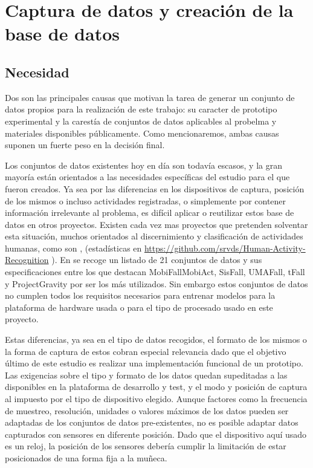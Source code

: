 
\section{Captura de datos y creación de la base de datos}
\subsection{Necesidad}
Dos son las principales causas que motivan la tarea de generar un conjunto de datos propios para la realización de este trabajo: su caracter de prototipo experimental y la carestía de conjuntos de datos aplicables al probelma y materiales disponibles públicamente. Como mencionaremos, ambas causas suponen un fuerte peso en la decisión final.

Los conjuntos de datos existentes hoy en día son todavía escasos, y la gran mayoría están orientados a las necesidades específicas del estudio para el que fueron creados. Ya sea por las diferencias en los dispositivos de captura, posición de los mismos o incluso actividades registradas, o simplemente por contener información irrelevante al problema, es difícil aplicar o reutilizar estos base de datos en otros proyectos. Existen cada vez mas proyectos que pretenden solventar esta situación, muchos orientados al discernimiento y clasificación de actividades humanas, como son \cite{Anguita2013,ReyesOrtiz2014}, (estadísticas en \url{https://github.com/srvds/Human-Activity-Recognition} ). En \cite{Casilari2020} se recoge un listado de 21 conjuntos de datos y sus especificaciones entre los que destacan MobiFall\cite{MobiFall}\/MobiAct\cite{MobiAct}, SisFall\cite{Sucerquia2017}, UMAFall\cite{Edu/UMA/2017}, tFall\cite{tfall} y ProjectGravity\cite{Vilarinho2015} por ser los más utilizados. Sin embargo estos conjuntos de datos no cumplen todos los requisitos necesarios para entrenar modelos para la plataforma de hardware usada o para el tipo de procesado usado en este proyecto.

Estas diferencias, ya sea en el tipo de datos recogidos, el formato de los mismos o la forma de captura de estos cobran especial relevancia dado que el objetivo último de este estudio es realizar una implementación funcional de un prototipo. Las exigencias sobre el tipo y formato de los datos quedan supeditadas a las disponibles en la plataforma de desarrollo y test, y el modo y posición de captura al impuesto por el tipo de dispositivo elegido. Aunque factores como la frecuencia de muestreo, resolución, unidades o valores máximos de los datos pueden ser adaptadas de los conjuntos de datos pre-existentes, no es posible adaptar datos capturados con sensores en diferente posición. Dado que el dispositivo aquí usado es un reloj, la posición de los sensores debería cumplir la limitación de estar posicionados de una forma fija a la muñeca.

